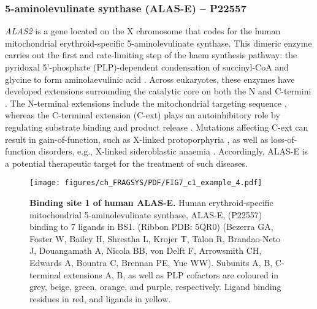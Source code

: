 \subsubsection{5-aminolevulinate synthase (ALAS-E) -- P22557}

\textit{ALAS2} is a gene located on the X chromosome that codes for the human mitochondrial erythroid-specific 5-aminolevulinate synthase. This dimeric enzyme carries out the first and rate-limiting step of the haem synthesis pathway: the pyridoxal 5’-phosphate (PLP)-dependent condensation of succinyl-CoA and glycine to form aminolaevulinic acid \cite{AKHTAR_1976_PORPHYRIN}. Across eukaryotes, these enzymes have developed extensions surrounding the catalytic core on both the N and C-termini \cite{MUNAKATA_1993_AMINOLEVULINATE}. The N-terminal extensions include the mitochondrial targeting sequence \cite{SRIVASTAVA_1988_AMINOLEVULINATE}, whereas the C-terminal extension (C-ext) plays an autoinhibitory role by regulating substrate binding and product release \cite{BAILEY_2020_AMINOLEVULINATE}. Mutations affecting C-ext can result in gain-of-function, such as X-linked protoporphyria \cite{WHATLEY_2008_AMINOLEVULINATE}, as well as loss-of-function disorders, e.g., X-linked sideroblastic anaemia \cite{DUCAMP_2011_SIDEROBLASTIC}. Accordingly, ALAS-E is a potential therapeutic target for the treatment of such diseases.

\begin{figure}[htb!]
    \centering
    \texttt{[image: figures/ch\_FRAGSYS/PDF/FIG7\_c1\_example\_4.pdf]}
    \caption[Binding site 1 of human ALAS-E]{\textbf{Binding site 1 of human ALAS-E.} Human erythroid-specific mitochondrial 5-aminolevulinate synthase, ALAS-E, (P22557) binding to 7 ligands in BS1. (Ribbon PDB: 5QR0) (Bezerra GA, Foster W, Bailey H, Shrestha L, Krojer T, Talon R, Brandao-Neto J, Douangamath A, Nicola BB, von Delft F, Arrowsmith CH, Edwards A, Bountra C, Brennan PE, Yue WW). Subunits A, B, C-terminal extensions A, B, as well as PLP cofactors are coloured in grey, beige, green, orange, and purple, respectively. Ligand binding residues in red, and ligands in yellow.}
    \label{fig:c1_example_4}
\end{figure}

